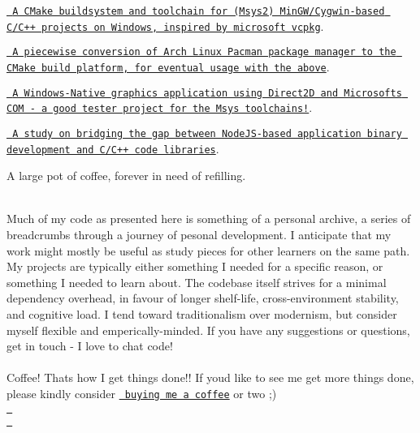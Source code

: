 \begin{longtabu}
\begin{DoxyItemize}
\item \href{https://github.com/StoneyDSP/MSYS2-toolchain.git}{\texttt{ A CMake buildsystem and toolchain for (Msys2) Min\+GW/\+Cygwin-\/based C/\+C++ projects on Windows, inspired by microsoft vcpkg}}.
\item \href{https://github.com/StoneyDSP/MSYS2-pacman.git}{\texttt{ A piecewise conversion of Arch Linux Pacman package manager to the CMake build platform, for eventual usage with the above}}.
\item \href{https://github.com/StoneyDSP/CxxWin.git}{\texttt{ A Windows-\/\+Native graphics application using Direct2D and Microsoft\textquotesingle{}s COM -\/ a good tester project for the Msys toolchains!}}.
\item \href{https://github.com/cmodules/cmodules}{\texttt{ A study on bridging the gap between Node\+JS-\/based application binary development and C/\+C++ code libraries}}.
\item A large pot of coffee, forever in need of refilling.
\end{DoxyItemize}

\\
\PBS\centering Much of my code as presented here is something of a personal archive, a series of breadcrumbs through a journey of pesonal development. I anticipate that my work might mostly be useful as study pieces for other learners on the same path. My projects are typically either something I needed for a specific reason, or something I needed to learn about. The codebase itself strives for a minimal dependency overhead, in favour of longer shelf-\/life, cross-\/environment stability, and cognitive load. I tend toward traditionalism over modernism, but consider myself flexible and emperically-\/minded. If you have any suggestions or questions, get in touch -\/ I love to chat code!    \\
\PBS\centering \\
\PBS\centering Coffee! That\textquotesingle{}s how I get things done!! If you\textquotesingle{}d like to see me get more things done, please kindly consider \href{https://www.patreon.com/bePatron?u=8549187}{\texttt{ buying me a coffee}} or two ;)    \\
\PBS\centering \href{https://paypal.me/StoneyDSPAudio?country.x=ES&locale.x=en_US}{\texttt{ }}    \\
\PBS\centering \href{https://www.patreon.com/bePatron?u=8549187}{\texttt{ }}   \\
\end{longtabu}
